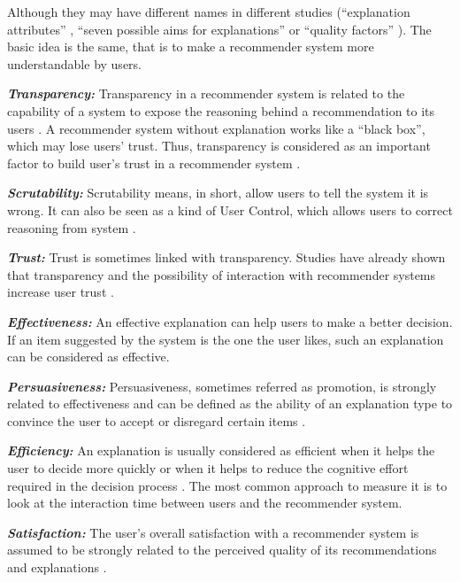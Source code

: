         \indent 
        Although they may have different names in different studies (``explanation attributes'' \cite{al2013explanations}, ``seven possible aims for explanations'' \cite{tintarev2012evaluating} or ``quality factors'' \cite{gedikli2014should}). The basic idea is the same, that is to make a recommender system more understandable by users.
        
        \indent 
        \textbf{\textit{Transparency:}} Transparency in a recommender system is related to the capability of a system to expose the reasoning behind a recommendation to its users \cite{herlocker2000explaining}. A recommender system without explanation works like a ``black box'', which may lose users' trust. Thus, transparency is considered as an important factor to build user's trust in a recommender system \cite{swearingen2002interaction}.

        \indent 
        \textbf{\textit{Scrutability:}} Scrutability means, in short, allow users to tell the system it is wrong. It can also be seen as a kind of User Control, which allows users to correct reasoning from system \cite{czarkowski2002scrutable}.

        \indent
        \textbf{\textit{Trust:}} Trust is sometimes linked with transparency. Studies have already shown that transparency and the possibility of interaction with recommender systems increase user trust \cite{felfernig2007knowledge} \cite{sinha2002role}.

        \indent
        \textbf{\textit{Effectiveness:}} An effective explanation can help users to make a better decision. If an item suggested by the system is the one the user likes, such an explanation can be considered as effective.

        \indent
        \textbf{\textit{Persuasiveness:}} Persuasiveness, sometimes referred as promotion, is strongly related to effectiveness and can be defined as the ability of an explanation type to convince the user to accept or disregard certain items \cite{gedikli2014should}.

        \indent 
        \textbf{\textit{Efficiency:}} An explanation is usually considered as efficient when it helps the user to decide more quickly or when it helps to reduce the cognitive effort required in the decision process \cite{gedikli2014should}. The most common approach to measure it is to look at the interaction time between users and the recommender system.

        \indent 
        \textbf{\textit{Satisfaction:}} The user’s overall satisfaction with a recommender system is assumed to be strongly related to the perceived quality of its recommendations and explanations \cite{swearingen2002interaction}.

